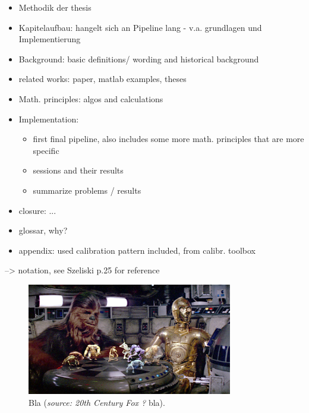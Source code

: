 
\begin{itemize}
\item Methodik der thesis
\item Kapitelaufbau: hangelt sich an Pipeline lang - v.a. grundlagen und Implementierung
\item Background: basic definitions/ wording and historical background
\item related works: paper, matlab examples, theses
\item Math. principles: algos and calculations
\item Implementation: 
	\begin{itemize}
	\item first final pipeline, also includes some more math. principles that are more specific
	\item sessions and their results
	\item summarize problems / results
	\end{itemize}
\item closure: ...
\item glossar, why?
\item appendix: used calibration pattern included, from calibr. toolbox
\end{itemize}

--> notation, see Szeliski p.25 for reference


\begin{figure}[htbp]
		\centering
		\includegraphics[width=0.8\textwidth]{figures/starWars}
		\caption[Bla]{Bla (\textit{source: 20th Century Fox ?} bla).}
		\label{fig:starWars}
\end{figure}

